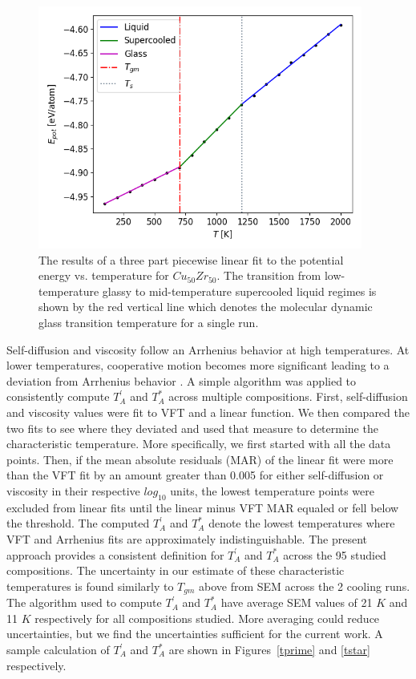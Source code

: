 \documentclass[11pt,a4paper]{article}                                %
\begin{document}
\begin{figure}[H]
\centering
\includegraphics[width=0.95\textwidth]{figures/tgm.png}
\caption{The results of a three part piecewise linear fit to the potential energy vs. temperature for $Cu_{50}Zr_{50}$. The transition from low-temperature glassy to mid-temperature supercooled liquid regimes is shown by the red vertical line which denotes the molecular dynamic glass transition temperature for a single run.}
\label{single_tg}
\end{figure}

\par
Self-diffusion and viscosity follow an Arrhenius behavior at high temperatures. At lower temperatures, cooperative motion becomes more significant leading to a deviation from Arrhenius behavior \cite{Iwashita2013, Jaiswal2016}. A simple algorithm was applied to consistently compute $T_{A}^{'}$ and $T_{A}^{*}$ across multiple compositions. First, self-diffusion and viscosity values were fit to VFT and a linear function. We then compared the two fits to see where they deviated and used that measure to determine the characteristic temperature. More specifically, we first started with all the data points. Then, if the mean absolute residuals (MAR) of the linear fit were more than the VFT fit by an amount greater than 0.005 for either self-diffusion or viscosity in their respective $log_{10}$ units, the lowest temperature points were excluded from linear fits until the linear minus VFT MAR equaled or fell below the threshold. The computed $T_{A}^{'}$ and $T_{A}^{*}$ denote the lowest temperatures where VFT and Arrhenius fits are approximately indistinguishable. The present approach provides a consistent definition for $T_{A}^{'}$ and $T_{A}^{*}$ across the 95 studied compositions. The uncertainty in our estimate of these characteristic temperatures is found similarly to $T_{gm}$ above from SEM across the 2 cooling runs. The algorithm used to compute $T_{A}^{'}$ and $T_{A}^{*}$ have average SEM values of 21 $K$ and 11 $K$ respectively for all compositions studied. More averaging could reduce uncertainties, but we find the uncertainties sufficient for the current work. A sample calculation of $T_{A}^{'}$ and $T_{A}^{*}$ are shown in Figures~\ref{tprime} and \ref{tstar} respectively.
\end{document}
